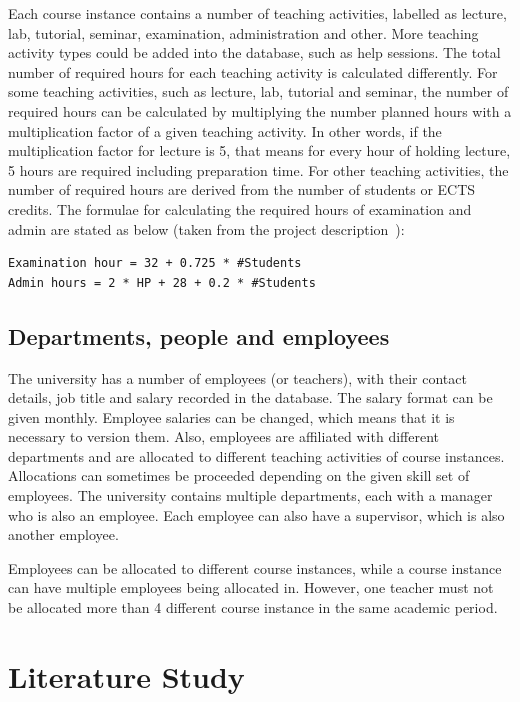 \documentclass[a4paper]{scrartcl}
\renewcommand{\_}{\textunderscore\allowbreak}
\begin{document}
Each course instance contains a number of teaching activities, labelled as lecture, lab, tutorial, seminar, examination, administration and other. More teaching activity types could be added into the database, such as help sessions. The total number of required hours for each teaching activity is calculated differently.
For some teaching activities, such as lecture, lab, tutorial and seminar, the number of required hours can be calculated by multiplying the number planned hours with a multiplication factor of a given teaching activity. In other words, if the multiplication factor for lecture is 5, that means for every hour of holding lecture, 5 hours are required including preparation time.
For other teaching activities, the number of required hours are derived from the number of students or ECTS credits. The formulae for calculating the required hours of examination and admin are stated as below (taken from the project description~\cite{project}):

\begin{lstlisting}[basicstyle=\ttfamily, columns=fullflexible, keepspaces=true]
Examination hour = 32 + 0.725 * #Students
Admin hours = 2 * HP + 28 + 0.2 * #Students
\end{lstlisting}

\subsection{Departments, people and employees}
The university has a number of employees (or teachers), with their contact details, job title and salary recorded in the database. The salary format can be given monthly. Employee salaries can be changed, which means that it is necessary to version them. Also, employees are affiliated with different departments and are allocated to different teaching activities of course instances. Allocations can sometimes be proceeded depending on the given skill set of employees. The university contains multiple departments, each with a manager who is also an employee. Each employee can also have a supervisor, which is also another employee.

Employees can be allocated to different course instances, while a course instance can have multiple employees being allocated in. However, one teacher must not be allocated more than 4 different course instance in the same academic period.

\section{Literature Study}
\end{document}

